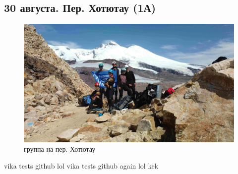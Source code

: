 \subsection{30 августа. Пер. Хотютау (1А)}

\begin{figure}[h!]
	\centering
	\includegraphics[width=0.7\linewidth]{../pics/DJI_0899}
	\caption{группа на пер. Хотютау}
	\label{fig:hotyutau_1}
\end{figure}

vika tests github lol 
vika tests github again lol kek
\newpage